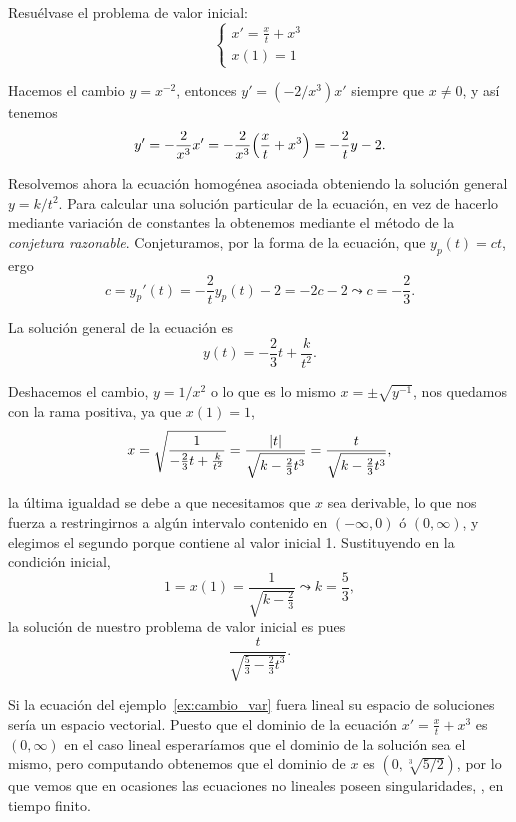 \documentclass[../ecuaciones_diferenciales.tex]{subfiles}
\begin{document}
\begin{example}
	\label{ex:cambio_var}
	Resuélvase el problema de valor inicial:
	\[\begin{cases}
			x' = \frac{x}{t} + x^3 \\
			x(1) = 1
		\end{cases}\]
\end{example}

\begin{solution}
	Hacemos el cambio \(y = x^{-2}\), entonces \(y' = (-2/x^3) x'\) siempre que
	\(x \neq 0\), y así tenemos
	\[y' = -\frac{2}{x^3} x' = -\frac{2}{x^3}\parens{\frac{x}{t} + x^3} =
		-\frac{2}{t}y - 2.\]

	Resolvemos ahora la ecuación homogénea asociada obteniendo la solución
	general \(y = k/t^2\). Para calcular una solución particular de la
	ecuación, en vez de hacerlo mediante variación de constantes la obtenemos
	mediante el método de la \emph{conjetura razonable}. Conjeturamos, por la
	forma de la ecuación, que \(y_p(t) = ct\), ergo
	\[c = y_p'(t) = -\frac{2}{t} y_p(t) - 2 = -2c -2
		\leadsto c = -\frac{2}{3}.\]

	La solución general de la ecuación es
	\[y(t) = -\frac{2}{3}t + \frac{k}{t^2}.\]

	Deshacemos el cambio, \(y = 1/x^2\) o lo que es lo mismo
	\(x = \pm \sqrt{y^{-1}}\), nos quedamos con la rama positiva, ya que
	\(x(1) = 1\),
	\[x = \sqrt{\frac{1}{-\frac{2}{3}t + \frac{k}{t^2}}} =
		\frac{\abs{t}}{\sqrt{k - \frac{2}{3}t^3}} = \frac{t}{\sqrt{k -
				\frac{2}{3}t^3}},\]

	la última igualdad se debe a que necesitamos que \(x\) sea derivable, lo que
	nos fuerza a restringirnos a algún intervalo contenido en
	\((-\infty, 0)\) ó \((0, \infty)\), y elegimos el segundo
	porque contiene al valor inicial 1.  Sustituyendo en la condición inicial,
	\[1 = x(1) = \frac{1}{\sqrt{k - \frac{2}{3}}} \leadsto k = \frac{5}{3},\]
	la solución de nuestro problema de valor inicial es pues
	\[\frac{t}{\sqrt{\frac{5}{3} - \frac{2}{3}t^3}}.\]
\end{solution}

\begin{remark}
	Si la ecuación del ejemplo~\ref{ex:cambio_var} fuera lineal su espacio de
	soluciones sería un espacio vectorial. Puesto que el dominio de la ecuación
	\(x' = \frac{x}{t} + x^3\) es \((0, \infty)\) en el caso lineal esperaríamos
	que el dominio de la solución sea el mismo, pero computando obtenemos que el
	dominio de \(x\) es \((0, \sqrt[3]{5/2})\), por lo que vemos que en ocasiones
	las ecuaciones no lineales poseen singularidades, , 
	en tiempo finito.
\end{remark}
\end{document}
